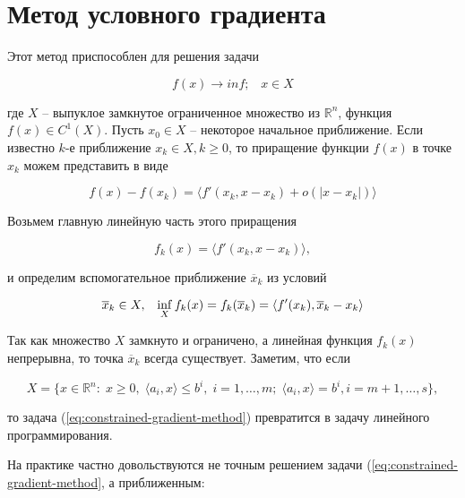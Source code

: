 \documentclass[a4paper, 12pt, titlepage]{article}
\theoremstyle{definition}
\theoremstyle{plain}
\theoremstyle{plain}
\begin{document}
\section{Метод условного градиента}

Этот метод приспособлен для решения задачи

\begin{equation}
 f(x) \to inf; \;\;\; x \in X
\end{equation}

где $X$ -- выпуклое замкнутое ограниченное множество из $\mathbb{R}^{n}$,
функция $f(x) \in C^{1}(X)$. Пусть $x_{0} \in X$ -- некоторое начальное
приближение. Если известно $k$-е приближение $x_{k} \in X, k \geq 0$, то
приращение функции $f(x)$ в точке $x_{k}$ можем представить в виде

\begin{equation}
 f(x) - f(x_{k}) = \langle f'(x_{k}, x - x_{k}) + o(|x - x_{k}|) \rangle
\end{equation}

Возьмем главную линейную часть этого приращения

\begin{equation}
 f_{k}(x) = \langle f'(x_{k}, x - x_{k}) \rangle,
\end{equation}

и определим вспомогательное приближение $\overline{x}_{k}$ из условий

\begin{equation}
 \label{eq:constrained-gradient-method}
 \overline{x}_{k} \in X, \;\;\;
 \operatornamewithlimits{inf}_{X} f_{k}(x) = f_{k}(\overline{x}_{k}) =
 \langle f'(x_{k}), \overline{x}_{k} - x_{k} \rangle
\end{equation}

Так как множество $X$ замкнуто и ограничено, а линейная функция $f_{k}(x)$
непрерывна, то точка $\overline{x}_{k}$ всегда существует. Заметим, что если

\begin{equation}
 X = \{x \in \mathbb{R}^{n}: \; x \geq 0, \;
 \langle a_{i}, x \rangle \leq b^{i}, \; i = 1, \ldots, m; \;
 \langle a_{i}, x \rangle = b^{i}, i = m + 1, \ldots, s \},
\end{equation}

то задача (\ref{eq:constrained-gradient-method}) превратится в задачу линейного
программирования.

На практике частно довольствуются не точным решением задачи
(\ref{eq:constrained-gradient-method}, а приближенным:
\end{document}
